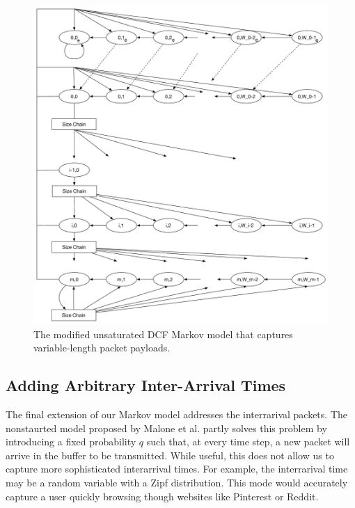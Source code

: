 \documentclass[conference]{IEEEtran}
\begin{document}
\begin{figure}
\begin{center}
\includegraphics[scale=0.5]{../sketches/dcf_model_unsaturated_varpktsize.pdf}
\caption{The modified unsaturated DCF Markov model that captures variable-length packet payloads.}
\label{fig:dcf_model_unsaturated_varpktsize}
\end{center}
\end{figure}

\subsection{Adding Arbitrary Inter-Arrival Times}
The final extension of our Markov model addresses the interrarival packets. The nonstaurted model proposed by Malone et al. \cite{dcf-nonsaturated} partly solves this problem by introducing a fixed probability $q$ such that, at every time step, a new packet will arrive in the buffer to be transmitted. While useful, this does not allow us to capture more sophisticated interarrival times. For example, the interrarival time may be a random variable with a Zipf distribution. This mode would accurately capture a user quickly browsing though websites like Pinterest or Reddit. 
\end{document}
